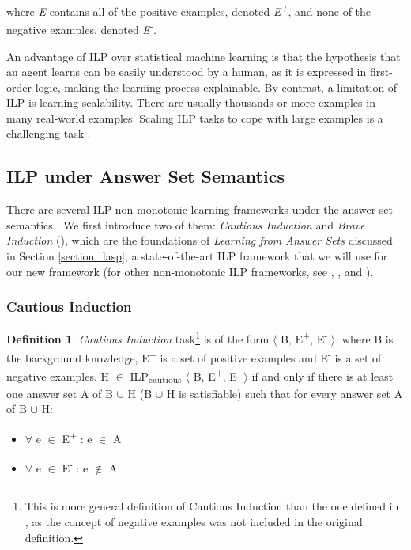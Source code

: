\documentclass[11pt,twoside]{report}
\theoremstyle{plain}
\theoremstyle{definition}
\newtheorem{defn}[thm]{Definition} %
\begin{document}
where \textit{E} contains all of the positive examples, denoted \textit{E\textsuperscript{+}}, and none of the negative examples, denoted \textit{E\textsuperscript{-}}.

An advantage of ILP over statistical machine learning is that the hypothesis that an agent learns can be easily understood by a human, as it is expressed in first-order logic, making the learning process explainable.
By contrast, a limitation of ILP is learning scalability. There are usually thousands or more examples in many real-world examples. Scaling ILP tasks to cope with large examples is a challenging task \cite{Muggleton1993}.

\subsection{ILP under Answer Set Semantics}
There are several ILP non-monotonic learning frameworks under the answer set semantics . We first introduce two of them: \textit{Cautious Induction} and \textit{Brave Induction} (\cite{Sakama2009}), which are the foundations of \textit{Learning from Answer Sets} discussed in Section \ref{section_lasp}, a state-of-the-art ILP framework that we will use for our new framework (for other non-monotonic ILP frameworks, see \cite{Otero2001}, \cite{Inoue2014}, \cite{Corapi2012} and \cite{DeRaedt1997}).
\subsubsection{Cautious Induction }

\begin{defn}
\textit{Cautious Induction} task\footnote{This is more general definition of Cautious Induction than the one defined in \cite{Sakama2009}, as the concept of negative examples was not included in the original definition.} is of the form $\langle$ B, E\textsuperscript{+}, E\textsuperscript{-} $\rangle$, where B is the background knowledge, E\textsuperscript{+} is a set of positive examples and E\textsuperscript{-} is a set of negative examples.
H $\in$ ILP\textsubscript{cautious} $\langle$ B, E\textsuperscript{+}, E\textsuperscript{-} $\rangle$ if and only if  there is at least one answer set A of B $\cup$ H (B $\cup$ H is satisfiable) such that for every answer set A of B $\cup$ H: \\
\begin{itemize}
\item $\forall$ e $\in$ E\textsuperscript{+} : e $\in$ A
\item $\forall$ e $\in$ E\textsuperscript{-} : e $\notin$ A
\end{itemize}
\end{defn}
\end{document}
